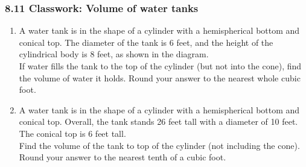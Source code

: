 \documentclass[12pt, twoside]{article}
\begin{document}
\subsubsection*{8.11 Classwork: Volume of water tanks}
 \begin{enumerate}

  \item A water tank is in the shape of a cylinder with a hemispherical bottom and conical top. The diameter of the tank is 6 feet, and the height of the cylindrical body is 8 feet, as shown in the diagram. \\[0.25cm]
  If water fills the tank to the top of the cylinder (but not into the cone), find the volume of water it holds. Round your answer to the nearest whole cubic foot.
  \begin{flushright}
\end{flushright} %

  \item A water tank is in the shape of a cylinder with a hemispherical bottom and conical top. Overall, the tank stands 26 feet tall with a diameter of 10 feet. The conical top is 6 feet tall. \\[0.25cm]
  Find the volume of the tank to top of the cylinder (not including the cone). Round your answer to the nearest tenth of a cubic foot.
  \begin{flushright}
\end{flushright}


\end{enumerate}
\end{document}

